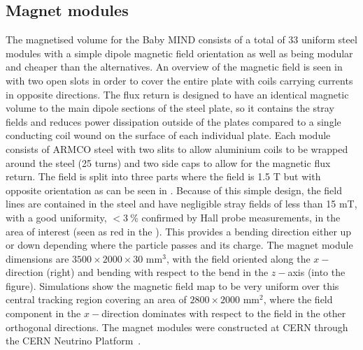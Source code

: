 

\subsection{Magnet modules}

The magnetised volume for the Baby MIND consists of a total of 33 uniform steel modules with a simple dipole magnetic field orientation as well as being modular and cheaper than the alternatives. An overview of the magnetic field is seen in  with two open slots in order to cover the entire plate with coils carrying currents in opposite directions. The flux return is designed to have an identical magnetic volume to the main dipole sections of the steel plate, so it contains the stray fields and reduces power dissipation outside of the plates compared to a single conducting coil wound on the surface of each individual plate. Each module consists of ARMCO steel with two slits to allow aluminium coils to be wrapped around the steel (25 turns) and two side caps to allow for the magnetic flux return. The field is split into three parts where the field is 1.5 T but with opposite orientation as can be seen in . Because of this simple design, the field lines are contained in the steel and have negligible stray fields of less than 15 mT, with a good uniformity, $< 3~\%$ confirmed by Hall probe measurements, in the area of interest (seen as red in the ). This provides a bending direction either up or down depending where the particle passes and its charge. The magnet module dimensions are $3500 \times 2000 \times 30$ mm$^3$, with the field oriented along the $x-$direction (right) and bending with respect to the bend in the $z-$axis (into the figure). Simulations show the magnetic field map to be very uniform over this central tracking region covering an area of $2800 \times 2000$ mm$^2$, where the field component in the $x-$direction dominates with respect to the field in the other orthogonal directions. The magnet modules were constructed at CERN through the CERN Neutrino Platform~\cite{50MagnetMIND}.

